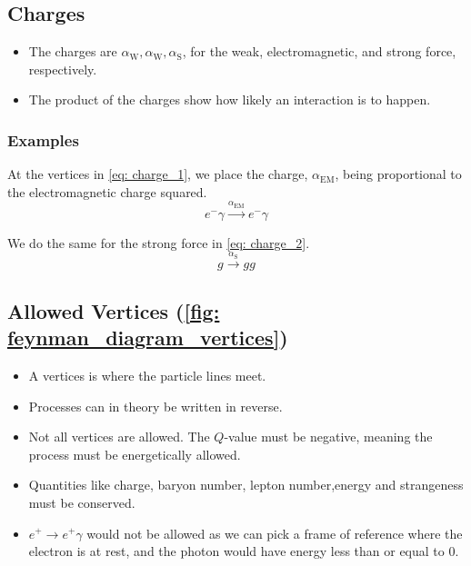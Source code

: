 \subsection{Charges}
\begin{itemize}
    \item The charges are $α_{\text{W}}, α_{\text{W}}, α_{\text{S}}$, for the weak, electromagnetic, and strong force, respectively.
    \item The product of the charges show how likely an interaction is to happen.
\end{itemize}

\subsubsection{Examples}
At the vertices in \cref{eq: charge_1}, we place the charge, $α_{\text{EM}}$, being proportional to the electromagnetic charge squared. 
\begin{equation}\label{eq: charge_1}
e^{-} γ \stackrel{α_{\text{EM}}}{→} e^{-} γ
\end{equation}

We do the same for the strong force in \cref{eq: charge_2}.
\begin{equation}\label{eq: charge_2}
  g \stackrel{α_{\text{S}}}{→} gg
\end{equation}

\subsection{Allowed Vertices (\cref{fig: feynman_diagram_vertices})}
\begin{itemize}
    \item A vertices is where the particle lines meet. 
    \item Processes can in theory be written in reverse. 
    \item Not all vertices are allowed. The $Q$-value must be negative, meaning the process must be energetically allowed.
    \item Quantities like charge, baryon number, lepton number,energy and strangeness must be conserved. 
    \item $e^{+} → e^{+}γ$ would not be allowed as we can pick a frame of reference where the electron is at rest, and the photon would have energy less than or equal to 0.
\end{itemize}

